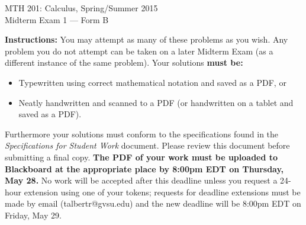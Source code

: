\documentclass[addpoints]{exam}
\begin{document}
\begin{center}
	\begin{large}
		MTH 201: Calculus, Spring/Summer 2015 \\
		Midterm Exam 1 --- Form B
	\end{large}
\end{center}

\noindent
\textbf{Instructions:} You may attempt as many of these problems as you wish. Any problem you do not attempt can be taken on a later Midterm Exam (as a different instance of the same problem). Your solutions \textbf{must be:}
\begin{itemize}
	\item Typewritten using correct mathematical notation and saved as a PDF, or 
	\item Neatly handwritten and scanned to a PDF (or handwritten on a tablet and saved as a PDF). 
\end{itemize}
Furthermore your solutions must conform to the specifications found in the \emph{Specifications for Student Work} document. Please review this document before submitting a final copy. \textbf{The PDF of your work must be uploaded to Blackboard at the appropriate place by 8:00pm EDT on Thursday, May 28.} No work will be accepted after this deadline unless you request a 24-hour extension using one of your tokens; requests for deadline extensions must be made by email (talbertr@gvsu.edu) and the new deadline will be 8:00pm EDT on Friday, May 29. 

\hrulefill

\end{document}

